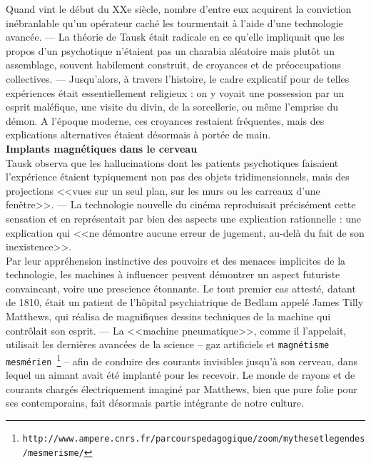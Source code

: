\documentclass[11pt,twoside,a4paper]{article}
\begin{document}
Quand vint le d{\'e}but du XXe si{\`e}cle, nombre d'entre eux acquirent la conviction in{\'e}branlable qu'un op{\'e}rateur cach{\'e} les tourmentait {\`a} l'aide d'une technologie avanc{\'e}e. --- La th{\'e}orie de Tausk {\'e}tait radicale en ce qu'elle impliquait que les propos d'un psychotique n'{\'e}taient pas un charabia al{\'e}atoire mais plut{\^o}t un assemblage, souvent habilement construit, de croyances et de pr{\'e}occupations collectives. --- Jusqu'alors, {\`a} travers l'histoire, le cadre explicatif pour de telles exp{\'e}riences {\'e}tait essentiellement religieux : on y voyait une possession par un esprit mal{\'e}fique, une visite du divin, de la sorcellerie, ou m{\^e}me l'emprise du d{\'e}mon. A l'{\'e}poque moderne, ces croyances restaient fr{\'e}quentes, mais des explications alternatives {\'e}taient d{\'e}sormais {\`a} port{\'e}e de main.~\\

\textbf{\Large Implants magn{\'e}tiques dans le cerveau}~\\

Tausk observa que les hallucinations dont les patients psychotiques faisaient l'exp{\'e}rience {\'e}taient typiquement non pas des objets tridimensionnels, mais des projections <<vues sur un seul plan, sur les murs ou les carreaux d'une fen{\^e}tre>>. --- La technologie nouvelle du cin{\'e}ma reproduisait pr{\'e}cis{\'e}ment cette sensation et en repr{\'e}sentait par bien des aspects une explication rationnelle : une explication qui <<ne d{\'e}montre aucune erreur de jugement, au-del{\`a} du fait de son inexistence>>.~\\

Par leur appr{\'e}hension instinctive des pouvoirs et des menaces implicites de la technologie, les machines {\`a} influencer peuvent d{\'e}montrer un aspect futuriste convaincant, voire une prescience {\'e}tonnante. Le tout premier cas attest{\'e}, datant de 1810, {\'e}tait un patient de l'h{\^o}pital psychiatrique de Bedlam appel{\'e} James Tilly Matthews, qui r{\'e}alisa de magnifiques dessins techniques de la machine qui contr{\^o}lait son esprit. --- La <<machine pneumatique>>, comme il l'appelait, utilisait les derni{\`e}res avanc{\'e}es de la science -- gaz artificiels et \texttt{magn{\'e}tisme mesm{\'e}rien~\footnote{\texttt{http://www.ampere.cnrs.fr/parcourspedagogique/zoom/mythesetlegendes/mesmerisme/}}} -- afin de conduire des courants invisibles jusqu'{\`a} son cerveau, dans lequel un aimant avait {\'e}t{\'e} implant{\'e} pour les recevoir. Le monde de rayons et de courants charg{\'e}s {\'e}lectriquement imagin{\'e} par Matthews, bien que pure folie pour ses contemporains, fait d{\'e}sormais partie int{\'e}grante de notre culture.~\\
\end{document}
